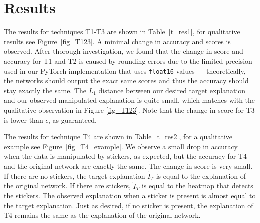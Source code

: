 \documentclass{article}
\begin{document}
\section{Results}

The results for techniques T1-T3 are shown in Table~\ref{t_res1}, for qualitative results see Figure~\ref{fig_T123}. A minimal change in accuracy and scores is observed. After thorough investigation, we found that the change in score and accuracy for T1 and T2 is caused by rounding errors due to the limited precision used in our PyTorch implementation that uses \verb-float16- values --- theoretically, the networks should output the exact same scores and thus the accuracy should stay exactly the same. The $L_1$ distance between our desired target explanation and our observed manipulated explanation is quite small, which matches with the qualitative observation in Figure \ref{fig_T123}. Note that the change in score for T3 is lower than $\epsilon$, as guaranteed.

The results for technique T4 are shown in Table~\ref{t_res2}, for a  qualitative example see Figure~\ref{fig_T4_example}. We observe a small drop in accuracy when the data is manipulated by stickers, as expected, but the accuracy for T4 and the original network are exactly the same. The change in score is very small. If there are no stickers, the target explanation $\tilde{I}_T$ is equal to the explanation of the original network. If there are stickers, $\tilde{I}_T$ is equal to the heatmap that detects the stickers. The observed explanation when a sticker is present is almost equal to the target explanation. Just as desired, if no sticker is present, the explanation of T4 remains the same as the explanation of the original network.
\end{document}
